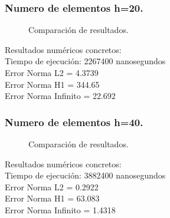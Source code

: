 \documentclass[12pt]{article}
\begin{document}
\subsubsection{Numero de elementos h=20.}
\begin{figure}[H]
    \centering
    \begin{subfigure}{0.32\textwidth}
        
    \end{subfigure}
    \hfill
    \begin{subfigure}{0.32\textwidth}
        
    \end{subfigure}
    \hfill
    \begin{subfigure}{0.32\textwidth}
        
    \end{subfigure}
    \caption{Comparación de resultados.}
    \label{fig:tresgraficas}
\end{figure}
Resultados numéricos concretos:\\
Tiempo de ejecución: 2267400 nanosegundos\\
Error Norma L2 = 4.3739\\
Error Norma H1 = 344.65\\
Error Norma Infinito = 22.692\\
\subsubsection{Numero de elementos h=40.}
\begin{figure}[H]
    \centering
    \begin{subfigure}{0.32\textwidth}
        
    \end{subfigure}
    \hfill
    \begin{subfigure}{0.32\textwidth}
        
    \end{subfigure}
    \hfill
    \begin{subfigure}{0.32\textwidth}
        
    \end{subfigure}
    \caption{Comparación de resultados.}
    \label{fig:tresgraficas}
\end{figure}
Resultados numéricos concretos:\\
Tiempo de ejecución: 3882400 nanosegundos\\
Error Norma L2 = 0.2922\\
Error Norma H1 = 63.083\\
Error Norma Infinito = 1.4318\\
\end{document}
